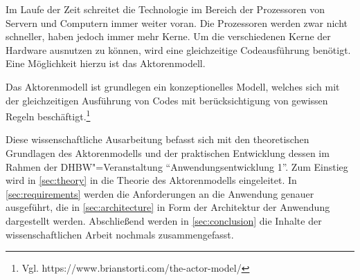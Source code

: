 Im Laufe der Zeit schreitet die Technologie im  Bereich der Prozessoren von Servern und Computern immer weiter voran.
Die Prozessoren werden zwar nicht schneller, haben jedoch immer mehr Kerne.
Um die verschiedenen Kerne der Hardware ausnutzen zu können, wird eine gleichzeitige Codeausführung benötigt.
Eine Möglichkeit hierzu ist das Aktorenmodell.

Das Aktorenmodell ist grundlegen ein konzeptionelles Modell, welches sich mit der gleichzeitigen Ausführung von Codes mit berücksichtigung von gewissen Regeln beschäftigt.\footnote{Vgl. https://www.brianstorti.com/the-actor-model/} 

Diese wissenschaftliche Ausarbeitung befasst sich mit den theoretischen Grundlagen des Aktorenmodells und der praktischen Entwicklung dessen im Rahmen der DHBW"=Veranstaltung \enquote{Anwendungsentwicklung 1}.
Zum Einstieg wird in \autoref{sec:theory} in die Theorie des Aktorenmodells eingeleitet.
In \autoref{sec:requirements} werden die Anforderungen an die Anwendung genauer ausgeführt, die in \autoref{sec:architecture} in Form der Architektur der Anwendung dargestellt werden.
Abschließend werden in \autoref{sec:conclusion} die Inhalte der wissenschaftlichen Arbeit nochmals zusammengefasst.
